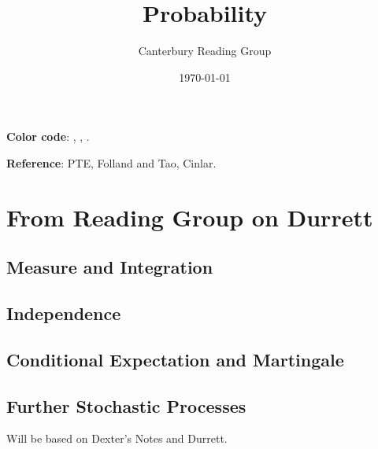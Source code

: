 \documentclass[12pt, oneside]{book}
\begin{document}
    \title{Probability}\author{Canterbury Reading Group}\date{\today}
    \tableofcontents
    
    \textbf{Color code}: , , . 

    \textbf{Reference}: PTE, Folland and Tao, Cinlar.
    \chapter{From Reading Group on Durrett}  
        \section{Measure and Integration}
        \section{Independence}
        \section{Conditional Expectation and Martingale}
        \section{Further Stochastic Processes}Will be based on Dexter's Notes and Durrett.

\end{document}
